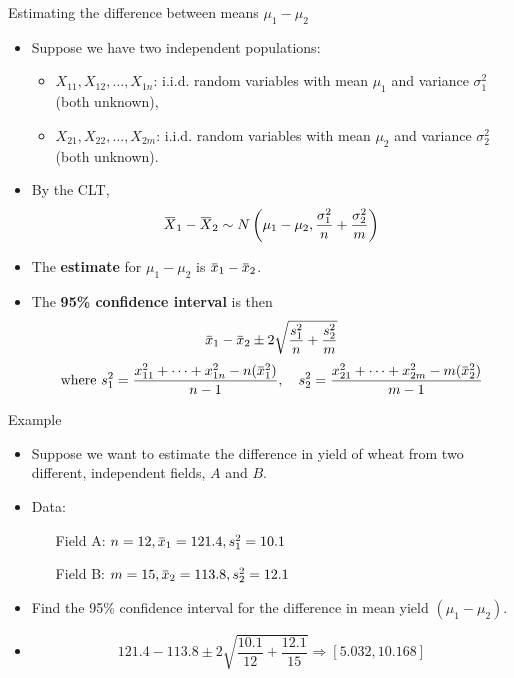\documentclass[10pt, xcolor=table]{beamer}
\newcommand*\themecol{\usebeamercolor[fg]{structure}}
\newcommand{\overbar}[1]{\mkern 1.5mu\overline{\mkern-1.5mu#1\mkern-1.5mu}\mkern 1.5mu}
\begin{document}
\begin{frame}{Estimating the difference between means $\mu_1 - \mu_2$}
\begin{itemize}
\setlength{\itemsep}{10pt}
\item Suppose we have two independent populations:
\begin{itemize}
\vspace*{6pt}
\setlength{\itemsep}{6pt}
\item $X_{11}, X_{12},\dots, X_{1n}$: i.i.d. random variables with mean $\mu_1$ and variance $\sigma_1^2$ (both unknown), 
\item $X_{21}, X_{22}, \dots, X_{2m}$: i.i.d. random variables with mean $\mu_2$ and variance $\sigma_2^2$ (both unknown).
\end{itemize}
\item By the CLT, {\small
\[
\overbar{X}_1 - \overbar{X}_2 \sim N\left(\mu_1 - \mu_2, \frac{\sigma_1^2}{n} + \frac{\sigma_2^2}{m}\right)
\]
}
\item The \textbf{estimate} for $\mu_1 - \mu_2$ is {\themecol $\overbar{x}_1 - \overbar{x}_2$}.
\item The \textbf{95\% confidence interval} is then
\begin{align*}
\overbar{x}_1 - \overbar{x}_2 \pm 2 \sqrt{\frac{s_1^2}{n} + \frac{s_2^2}{m}}
\end{align*}
{\footnotesize
$$ \text{where } s_1^2 = \frac{x_{11}^2 + \cdots + x_{1n}^2 - n(\overbar{x}_1^2)}{n-1}, \quad s_2^2 = \frac{x_{21}^2 + \cdots + x_{2m}^2 - m(\overbar{x}_2^2)}{m-1}$$}
\end{itemize}
\end{frame}

\begin{frame}{Example}
\begin{itemize}
\setlength{\itemsep}{15pt}
\item Suppose we want to estimate the difference in yield of wheat from two different, independent fields, $A$ and $B$. 
\item Data:

\hspace{1cm}
\begin{itemize}
\setlength{\itemsep}{8pt}
\item[Field A:] $n = 12, \overbar{x}_1 = 121.4, s_1^2 = 10.1$
\item[Field B:] $m = 15, \overbar{x}_2 = 113.8, s_2^2 = 12.1$
\end{itemize}
\item Find the 95\% confidence interval for the difference in mean yield $(\mu_1 - \mu_2)$. 
\item<2->[A:] {\color{red} 
$$121.4 - 113.8 \pm 2 \sqrt{\frac{10.1}{12} + \frac{12.1}{15}} \Rightarrow [5.032, 10.168]$$
} 
\end{itemize}
\end{frame}
\end{document}
